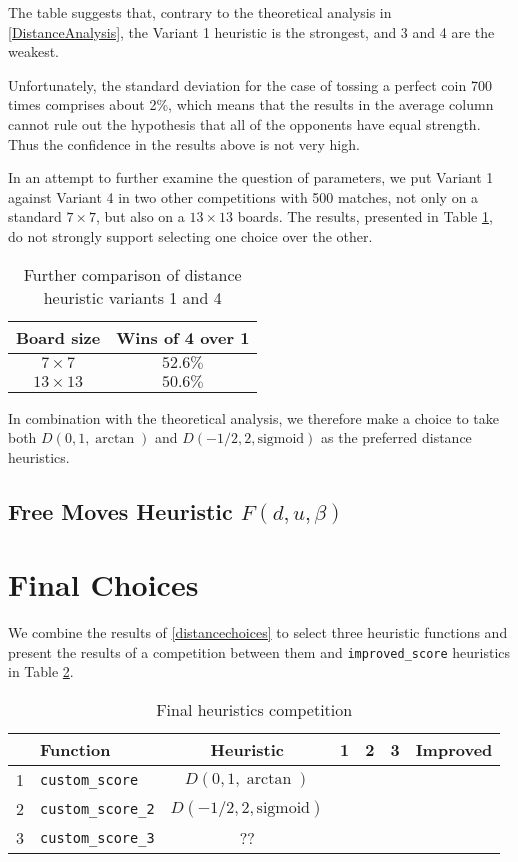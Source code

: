\documentclass[oneside]{article}   	%
\begin{document}
The table suggests that, contrary to the theoretical analysis in \ref{DistanceAnalysis}, the Variant 1 heuristic is the strongest, and 3 and 4 are the weakest.

Unfortunately, the standard deviation for the case of tossing a perfect coin 700 times comprises about 2\%, which means that the results in the average column cannot rule out the hypothesis that all of the opponents have equal strength. Thus the confidence in the results above is not very high.

In an attempt to further examine the question of parameters, we put Variant 1 against Variant 4 in two other competitions with 500 matches, not only on a standard $7\times 7$, but also on a $13\times 13$ boards. The results, presented in Table \ref{DistanceBoards}, do not strongly support selecting one choice over the other. 

\begin{table}[htp]
\caption{Further comparison of distance heuristic variants 1 and 4}
\begin{center}
\begin{tabular}{c|c}
   Board size & Wins of 4 over 1 \\
   \hline
 $7\times 7$   & $52.6\%$ \\
 $13\times 13$ & $50.6\%$
 
\end{tabular}
\end{center}
\label{DistanceBoards}
\end{table}%

In combination with the theoretical analysis, we therefore make a choice to take both $D(0, 1, \arctan)$ and $D(-1/2, 2, \textrm{sigmoid})$ as the preferred distance heuristics.


\subsection{Free Moves Heuristic $F(d, u, \beta)$}


\section{Final Choices}


We combine the results of \ref{distancechoices} to select three heuristic functions and present the  results of a competition between them and \texttt{improved\_score} heuristics in Table \ref{FinalCompetition}.

\begin{table}[htp]
\caption{Final heuristics competition}
\begin{center}
\begin{tabular}{clc|cccc}
   & Function & Heuristic & 1 & 2 & 3 & Improved \\
   \hline
1 & \texttt{custom\_score}    & $D(0, 1, \arctan)$             & & & &  \\
2 & \texttt{custom\_score\_2} & $D(-1/2, 2, \textrm{sigmoid})$ & & & & \\
3 & \texttt{custom\_score\_3} & ?? & & & &
\end{tabular}
\end{center}
\label{FinalCompetition}
\end{table}%
\end{document}
